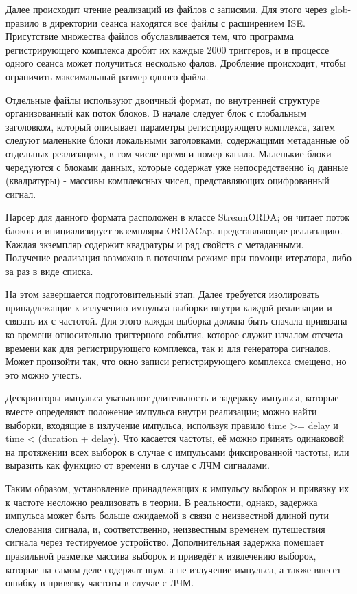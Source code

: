 \documentclass{report}
\begin{document}
Далее происходит чтение реализаций из файлов с записями. Для этого через glob-правило в директории сеанса находятся все файлы с расширением ISE. Присутствие множества файлов обуславливается тем, что программа регистрирующего комплекса дробит их каждые 2000 триггеров, и в процессе одного сеанса может получиться несколько фалов. Дробление происходит, чтобы ограничить максимальный размер одного файла.

Отдельные файлы используют двоичный формат, по внутренней структуре организованный как поток блоков. В начале следует блок с глобальным заголовком, который описывает параметры регистрирующего комплекса, затем следуют маленькие блоки локальными заголовками, содержащими метаданные об отдельных реализациях, в том числе время и номер канала. Маленькие блоки чередуются с блоками данных, которые содержат уже непосредственно iq данные (квадратуры) - массивы комплексных чисел, представляющих оцифрованный сигнал.

Парсер для данного формата расположен в классе StreamORDA; он читает поток блоков и инициализирует экземпляры ORDACap, представляющие реализацию. Каждая экземпляр содержит квадратуры и ряд свойств с метаданными. Получение реализация возможно в поточном режиме при помощи итератора, либо за раз в виде списка.

На этом завершается подготовительный этап. Далее требуется изолировать принадлежащие к излучению импульса выборки внутри каждой реализации и связать их с частотой. Для этого каждая выборка должна быть сначала привязана ко времени относительно триггерного события, которое служит началом отсчета времени как для регистрирующего комплекса, так и для генератора сигналов. Может произойти так, что окно записи регистрирующего комплекса смещено, но это можно учесть.

Дескрипторы импульса указывают длительность и задержку импульса, которые вместе определяют положение импульса внутри реализации; можно найти выборки, входящие в излучение импульса, используя правило time >= delay и time < (duration + delay). Что касается частоты, её можно принять одинаковой на протяжении всех выборок в случае с импульсами фиксированной частоты, или выразить как функцию от времени в случае с ЛЧМ сигналами.

Таким образом, установление принадлежащих к импульсу выборок и привязку их к частоте несложно реализовать в теории. В реальности, однако, задержка импульса может быть больше ожидаемой в связи с неизвестной длиной пути следования сигнала, и, соответственно, неизвестным временем путешествия сигнала через тестируемое устройство. Дополнительная задержка помешает правильной разметке массива выборок и приведёт к извлечению выборок, которые на самом деле содержат шум, а не излучение импульса, а также внесет ошибку в привязку частоты в случае с ЛЧМ.
\end{document}
